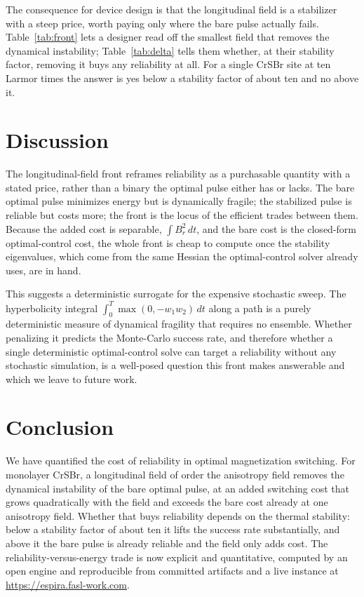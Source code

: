 \documentclass[11pt]{article}
\begin{document}
The consequence for device design is that the longitudinal field is a stabilizer with a steep price,
worth paying only where the bare pulse actually fails. Table~\ref{tab:front} lets a designer read off the
smallest field that removes the dynamical instability; Table~\ref{tab:delta} tells them whether, at their
stability factor, removing it buys any reliability at all. For a single CrSBr site at ten Larmor times
the answer is yes below a stability factor of about ten and no above it.

\section{Discussion}

The longitudinal-field front reframes reliability as a purchasable quantity with a stated price, rather
than a binary the optimal pulse either has or lacks. The bare optimal pulse minimizes energy but is
dynamically fragile; the stabilized pulse is reliable but costs more; the front is the locus of the
efficient trades between them. Because the added cost is separable, $\int B_r^2\,dt$, and the bare cost
is the closed-form optimal-control cost, the whole front is cheap to compute once the stability
eigenvalues, which come from the same Hessian the optimal-control solver already uses, are in hand.

This suggests a deterministic surrogate for the expensive stochastic sweep. The hyperbolicity integral
$\int_0^T \max(0, -w_1 w_2)\,dt$ along a path is a purely deterministic measure of dynamical fragility
that requires no ensemble. Whether penalizing it predicts the Monte-Carlo success rate, and therefore
whether a single deterministic optimal-control solve can target a reliability without any stochastic
simulation, is a well-posed question this front makes answerable and which we leave to future work.

\section{Conclusion}

We have quantified the cost of reliability in optimal magnetization switching. For monolayer CrSBr, a
longitudinal field of order the anisotropy field removes the dynamical instability of the bare optimal
pulse, at an added switching cost that grows quadratically with the field and exceeds the bare cost
already at one anisotropy field. Whether that buys reliability depends on the thermal stability: below
a stability factor of about ten it lifts the success rate substantially, and above it the bare pulse is
already reliable and the field only adds cost. The reliability-versus-energy trade is now explicit and
quantitative, computed by an open engine and reproducible from committed artifacts and a
live instance at \url{https://espira.fasl-work.com}.
\end{document}
